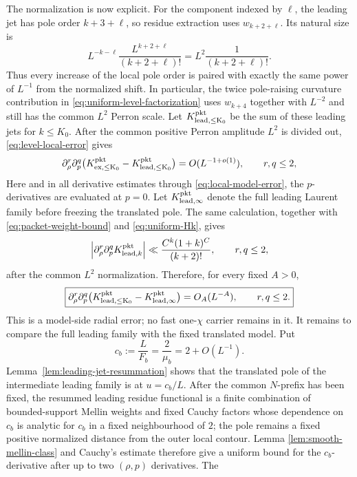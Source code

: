 The normalization is now explicit. For the component indexed by $\ell$, the
leading jet has pole order $k+3+\ell$, so residue extraction uses
$w_{k+2+\ell}$. Its natural size is
\[
L^{-k-\ell}\frac{L^{k+2+\ell}}{(k+2+\ell)!}
=L^2\frac1{(k+2+\ell)!}.
\]
Thus every increase of the local pole order is paired with exactly the same
power of $L^{-1}$ from the normalized shift. In particular, the twice
pole-raising curvature contribution in \eqref{eq:uniform-level-factorization}
uses $w_{k+4}$ together with $L^{-2}$ and still has the common $L^2$ Perron
scale. Let $K_{\rm lead,\le K_0}^{\rm pkt}$ be the sum of these leading jets for
$k\le K_0$. After the common positive Perron amplitude $L^2$ is divided out,
\eqref{eq:level-local-error} gives
\begin{equation}
\partial_\rho^r\partial_p^q
\bigl(K_{\rm ex,\le K_0}^{\rm pkt}-K_{\rm lead,\le K_0}^{\rm pkt}\bigr)
=O(L^{-1+o(1)}),
\qquad r,q\le2,
\label{eq:local-leading-error}
\end{equation}
Here and in all derivative estimates through
\eqref{eq:local-model-error}, the $p$-derivatives are evaluated at $p=0$. Let
$K_{\rm lead,\infty}^{\rm pkt}$ denote the full leading Laurent family before
freezing the translated pole. The same calculation, together with
\eqref{eq:packet-weight-bound} and \eqref{eq:uniform-Hk}, gives
\[
\left|\partial_\rho^r\partial_p^qK_{{\rm lead},k}^{\rm pkt}\right|
\ll \frac{C^k(1+k)^C}{(k+2)!},
\qquad r,q\le2,
\]
after the common $L^2$ normalization.
Therefore, for every fixed $A>0$,
\begin{equation}
\boxed{
\partial_\rho^r\partial_p^q
\bigl(K_{\rm lead,\le K_0}^{\rm pkt}-K_{\rm lead,\infty}^{\rm pkt}\bigr)
=O_A(L^{-A}),
\qquad r,q\le2.
}
\label{eq:model-truncation-tail}
\end{equation}
This is a model-side radial error; no fast one-$\chi$ carrier remains in it.
It remains to compare the full leading family with the fixed translated model. Put
\[
c_b:=\frac{L}{F_b}=\frac{2}{\mu_b}=2+O(L^{-1}).
\]
Lemma~\ref{lem:leading-jet-resummation} shows that the translated pole of the
intermediate leading family is at $u=c_b/L$. After the common $N$-prefix has
been fixed, the resummed leading residue functional is a finite combination of
bounded-support Mellin weights and fixed Cauchy factors whose dependence on
$c_b$ is analytic for $c_b$ in a fixed neighbourhood of $2$; the pole remains a
fixed positive normalized distance from the outer local contour. Lemma
\ref{lem:smooth-mellin-class} and Cauchy's estimate therefore give a uniform
bound for the $c_b$-derivative after up to two $(\rho,p)$ derivatives. The
